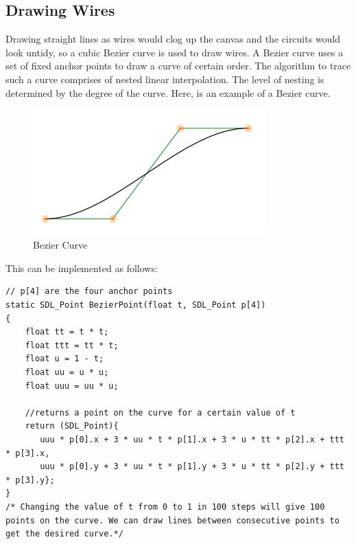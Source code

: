 \documentclass[report]{subfiles}
\begin{document}
	\subsection{Drawing Wires}
	 Drawing straight lines as wires would clog up the canvas and the circuits would look untidy, so a cubic Bezier curve is used to draw wires. A Bezier curve uses a set of fixed anchor points to draw a curve of certain order. The algorithm to trace such a curve comprises of nested linear interpolation. The level of nesting is determined by the degree of the curve. Here, is an example of a Bezier curve.
	 \begin{figure}[H]
    \centering
    \includegraphics[width=0.8\textwidth]{graphics/bezier_curve.png}
    \caption{Bezier Curve}
	\end{figure}
This can be implemented as follows:
\begin{lstlisting}
// p[4] are the four anchor points
static SDL_Point BezierPoint(float t, SDL_Point p[4])
{
    float tt = t * t;
    float ttt = tt * t;
    float u = 1 - t;
    float uu = u * u;
    float uuu = uu * u;

	//returns a point on the curve for a certain value of t
    return (SDL_Point){
       uuu * p[0].x + 3 * uu * t * p[1].x + 3 * u * tt * p[2].x + ttt * p[3].x,
       uuu * p[0].y + 3 * uu * t * p[1].y + 3 * u * tt * p[2].y + ttt * p[3].y};
}
/* Changing the value of t from 0 to 1 in 100 steps will give 100 points on the curve. We can draw lines between consecutive points to get the desired curve.*/
\end{lstlisting}
    
\end{document}
